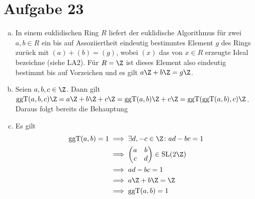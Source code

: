 \documentclass{article}
\begin{document}
  \section*{Aufgabe 23}
  \begin{enumerate}[(a)]
    \item In einem euklidischen Ring $R$ liefert der euklidische Algorithmus für zwei $a, b \in R$ ein bis auf Assoziiertheit eindeutig bestimmtes Element $g$ des Rings zurück mit $(a) + (b) = (g)$,
    wobei $(x)$ das von $x\in R$ erzeugte Ideal bezeichne (siehe LA2).
    Für $R = \Z$ ist dieses Element also eindeutig bestimmt bis auf Vorzeichen und es gilt $a\Z + b\Z = g\Z$.
    \item Seien $a, b, c \in \Z$. Dann gilt $\operatorname{ggT}(a, b, c)\Z = a \Z + b\Z + c\Z = \operatorname{ggT}(a, b) \Z + c\Z = \operatorname{ggT}(\operatorname{ggT}(a,b), c) \Z$. 
    Daraus folgt bereits die Behauptung
    \item Es gilt 
    \begin{align*}
      \operatorname{ggT}(a, b) = 1 
      &\implies \exists d, -c \in \Z\colon ad - bc = 1 \\
      &\implies \begin{pmatrix}
        a & b \\ c & d
      \end{pmatrix} \in \operatorname{SL}(2 \Z) \\
      &\implies ad - bc = 1 \\
      &\implies a\Z + b \Z = \Z\\
      &\implies \operatorname{ggT}(a, b) = 1
    \end{align*}
  \end{enumerate}
\end{document}

